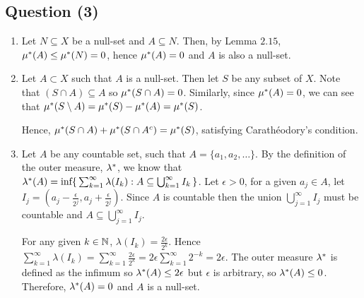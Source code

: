 \documentclass{article}
\begin{document}
\begin{center}
\section*{Question (3)}
\end{center}

\begin{flushleft}
    \begin{enumerate}[label=\roman*)]
        \item Let $N \subseteq X$ be a null-set and $A \subseteq N$. Then, by Lemma $2.15$, $\mu^\ast(A) \leq \mu^\ast(N) = 0$, hence $\mu^\ast(A) = 0$ and $A$ is also a null-set.
        \item Let $A \subset X$ such that $A$ is a null-set. Then let $S$ be any subset of $X$. Note that $(S \cap A) \subseteq A$ so $\mu^\ast(S \cap A) = 0$. Similarly, since $\mu^\ast(A) = 0$, we can see that $\mu^\ast(S \setminus A) = \mu^\ast(S) - \mu^\ast(A) = \mu^\ast(S)$. \newline

        Hence, $\mu^\ast(S \cap A) + \mu^\ast(S \cap A^c) = \mu^\ast(S)$, satisfying Carath\'{e}odory's condition.
        \item Let $A$ be any countable set, such that $A = \{a_1, a_2, \dots\}$. By the definition of the outer measure, $\lambda^\ast$, we know that $\lambda^\ast(A) = \text{inf}\{\,\sum_{k=1}^\infty \lambda(I_k) : A \subseteq \bigcup_{k=1}^\infty I_k \, \}$. Let $\epsilon > 0$, for a given $a_j \in A$, let $I_j = (a_j - \frac{\epsilon}{2^j}, a_j + \frac{\epsilon}{2^j})$. Since $A$ is countable then the union $\bigcup_{j=1}^\infty I_j$ must be countable and $A \subseteq \bigcup_{j=1}^\infty I_j$. \newline

        For any given $k \in \mathbb{N}$, $\lambda(I_k) = \frac{2\epsilon}{2^k}$. Hence $\sum_{k=1}^\infty \lambda(I_k) = \sum_{k=1}^\infty \frac{2\epsilon}{2^k} = 2\epsilon \sum_{k=1}^\infty 2^{-k} = 2\epsilon$. The outer measure $\lambda^\ast$ is defined as the infimum so $\lambda^\ast(A) \leq 2\epsilon$ but $\epsilon$ is arbitrary, so $\lambda^\ast(A) \leq 0$. Therefore, $\lambda^\ast(A) = 0$ and $A$ is a null-set.
    \end{enumerate}
\end{flushleft}
\end{document}
